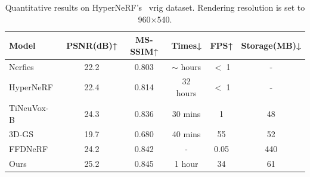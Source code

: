 \begin{table} 
\centering
\small
\caption{Quantitative results on HyperNeRF's~\cite{park2021hypernerf} vrig dataset. Rendering resolution is set to 960$\times$540.}
\setlength{\tabcolsep}{13pt}
\begin{tabular}{l|cc|c|cc} 
\toprule  
Model  & PSNR(dB)↑ & MS-SSIM↑  & Times↓ &  FPS↑ & Storage(MB)↓\\ 
\midrule  
Nerfies~\cite{park2021nerfies}&22.2&0.803&$\sim$ hours&$<$ 1&-\\
HyperNeRF~\cite{park2021hypernerf}&22.4&0.814&32 hours &$<$ 1&-\\
TiNeuVox-B~\cite{tineuvox}&\cellcolor{yellow}24.3&0.836&\cellcolor{pink}30 mins&1&\cellcolor{pink}48\\
3D-GS~\cite{3dgs}&19.7&0.680&\cellcolor{yellow}40 mins&\cellcolor{pink}55&\cellcolor{yellow}52\\
FFDNeRF~\cite{guo2023forwardflowfornvs}&24.2&\cellcolor{yellow}0.842&-&0.05&440\\
Ours&\cellcolor{pink}25.2&\cellcolor{pink}0.845&1 hour& \cellcolor{yellow}34&61\\
\bottomrule
\end{tabular}  
\label{tab:hypernerf}
\end{table}


